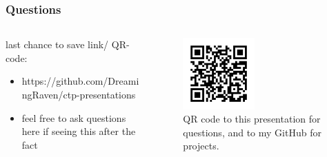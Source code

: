 \documentclass[aspectratio=169]{beamer}
\begin{document}
  \begin{frame}
    \frametitle{Questions}
    \begin{columns}
      \begin{column}{0.5\textwidth}
        last chance to save link/ QR-code:
        \begin{itemize}
          \item https://github.com/DreamingRaven/ctp-presentations
          \item feel free to ask questions here if seeing this after the fact
        \end{itemize}
      \end{column}
      \begin{column}{0.5\textwidth}
        \begin{figure}[th!]
          \centering
          \includegraphics[width=0.5\textwidth]{qrcode.png}
          \caption{QR code to this presentation for questions, and to my GitHub for projects. \autocite{repository}}
          \label{fig:qr}
        \end{figure}
      \end{column}
    \end{columns}
  \end{frame}
\end{document}
